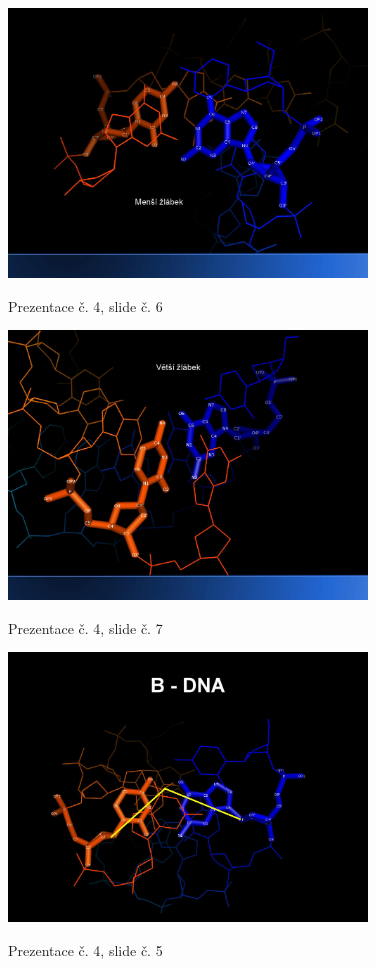\documentclass[DIV=8]{scrreprt}
\begin{document}
\begin{figure}
    \caption{Prezentace č. 4, slide č. 6}
    \includegraphics[width=0.85\textwidth]{slides-4/slide-6.jpg}
    \centering
    \label{slides-4-slide-6}
\end{figure}
\begin{figure}
    \caption{Prezentace č. 4, slide č. 7}
    \includegraphics[width=0.85\textwidth]{slides-4/slide-7.jpg}
    \centering
    \label{slides-4-slide-7}
\end{figure}
\begin{figure}
    \caption{Prezentace č. 4, slide č. 5}
    \includegraphics[width=0.85\textwidth]{slides-4/slide-5.jpg}
    \centering
    \label{slides-4-slide-5}
\end{figure}
\end{document}
